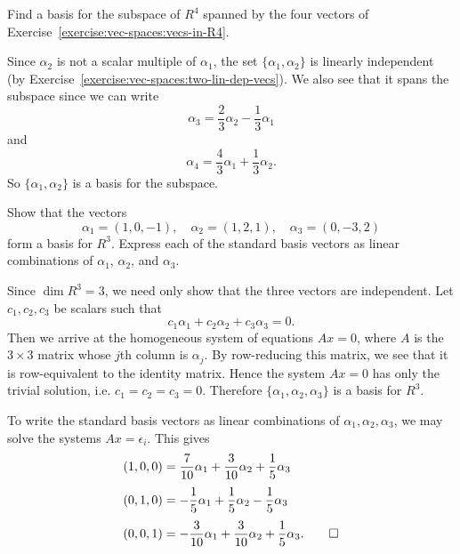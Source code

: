  Find a basis for the subspace of $R^4$ spanned by the four
vectors of Exercise~\ref{exercise:vec-spaces:vecs-in-R4}.
\begin{solution}
  Since $\alpha_2$ is not a scalar multiple of $\alpha_1$, the set
  $\{\alpha_1,\alpha_2\}$ is linearly independent (by
  Exercise~\ref{exercise:vec-spaces:two-lin-dep-vecs}). We also see
  that it spans the subspace since we can write
  \begin{equation*}
    \alpha_3 = \frac23\alpha_2 - \frac13\alpha_1
  \end{equation*}
  and
  \begin{equation*}
    \alpha_4 = \frac43\alpha_1 + \frac13\alpha_2.
  \end{equation*}
  So $\{\alpha_1,\alpha_2\}$ is a basis for the subspace.
\end{solution}

 Show that the vectors
\begin{equation*}
  \alpha_1 = (1, 0, -1), \quad \alpha_2 = (1, 2, 1),
  \quad \alpha_3 = (0, -3, 2)
\end{equation*}
form a basis for $R^3$. Express each of the standard basis vectors as
linear combinations of $\alpha_1$, $\alpha_2$, and $\alpha_3$.
\begin{solution}
  Since $\dim R^3 = 3$, we need only show that the three vectors are
  independent. Let $c_1,c_2,c_3$ be scalars such that
  \begin{equation*}
    c_1\alpha_1 + c_2\alpha_2 + c_3\alpha_3 = 0.
  \end{equation*}
  Then we arrive at the homogeneous system of equations $Ax = 0$,
  where $A$ is the $3\times3$ matrix whose $j$th column is
  $\alpha_j$. By row-reducing this matrix, we see that it is
  row-equivalent to the identity matrix. Hence the system $Ax = 0$ has
  only the trivial solution, i.e. $c_1 = c_2 = c_3 = 0$. Therefore
  $\{\alpha_1, \alpha_2, \alpha_3\}$ is a basis for $R^3$.

  To write the standard basis vectors as linear combinations of
  $\alpha_1,\alpha_2,\alpha_3$, we may solve the systems
  $Ax = \epsilon_i$. This gives
  \begin{align*}
    (1, 0, 0) &= \frac{7}{10}\alpha_1 + \frac3{10}\alpha_2 + \frac15\alpha_3 \\[3pt]
    (0, 1, 0) &= -\frac15\alpha_1 + \frac15\alpha_2 - \frac15\alpha_3 \\[3pt]
    (0, 0, 1) &= -\frac3{10}\alpha_1 + \frac3{10}\alpha_2 + \frac15\alpha_3.\qedhere
  \end{align*}
\end{solution}

